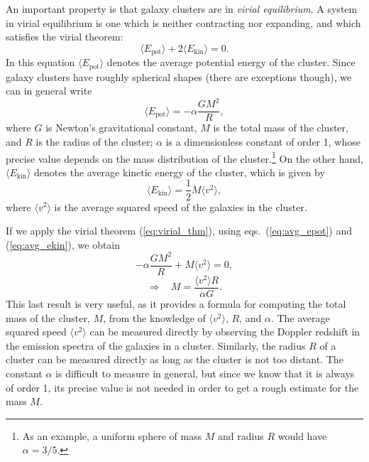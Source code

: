 \documentclass[11pt, a4paper,oneside,openright]{book}
\numberwithin{equation}{section}
\begin{document}
An important property is that galaxy clusters are in {\it virial equilibrium}. A system in virial equilibrium is one which is neither contracting nor expanding, and which satisfies the virial theorem:
\begin{equation} \label{eq:virial_thm}
\langle E_{\mathrm{pot}}\rangle +2\langle E_{\mathrm{kin}}\rangle =0.
\end{equation}
In this equation $\langle E_{\mathrm{pot}}\rangle$ denotes the average potential energy of the cluster. Since galaxy clusters have roughly spherical shapes (there are exceptions though), we can in general write
\begin{equation} \label{eq:avg_epot}
\langle E_{\mathrm{pot}}\rangle = -\alpha \frac{GM^2}{R},
\end{equation}
where $G$ is Newton's gravitational constant, $M$ is the total mass of the cluster, and $R$ is the radius of the cluster; $\alpha$ is a dimensionless constant of order 1, whose precise value depends on the mass distribution of the cluster.\footnote{As an example, a uniform sphere of mass $M$ and radius $R$ would have $\alpha=3/5$.} On the other hand, $\langle E_{\mathrm{kin}}\rangle$ denotes the average kinetic energy of the cluster, which is given by
\begin{equation} \label{eq:avg_ekin}
\langle E_{\mathrm{kin}}\rangle = \frac{1}{2}M\langle v^2\rangle,
\end{equation}
where $\langle v^2\rangle$ is the average squared speed of the galaxies in the cluster.

If we apply the virial theorem (\ref{eq:virial_thm}), using eqs.\ (\ref{eq:avg_epot}) and (\ref{eq:avg_ekin}), we obtain
\begin{equation}
-\alpha \frac{GM^2}{R}+M\langle v^2\rangle=0,
\end{equation}
\begin{equation}
\Rightarrow~~~~ M=\frac{\langle v^2\rangle R}{\alpha G}.
\end{equation}
This last result is very useful, as it provides a formula for computing the total mass of the cluster, $M$, from the knowledge of $\langle v^2\rangle$, $R$, and $\alpha$. The average squared speed $\langle v^2\rangle$ can be measured directly by observing the Doppler redshift in the emission spectra of the galaxies in a cluster. Similarly, the radius $R$ of a cluster can be measured directly as long as the cluster is not too distant. The constant $\alpha$ is difficult to measure in general, but since we know that it is always of order 1, its precise value is not needed in order to get a rough estimate for the mass $M$.
\end{document}
